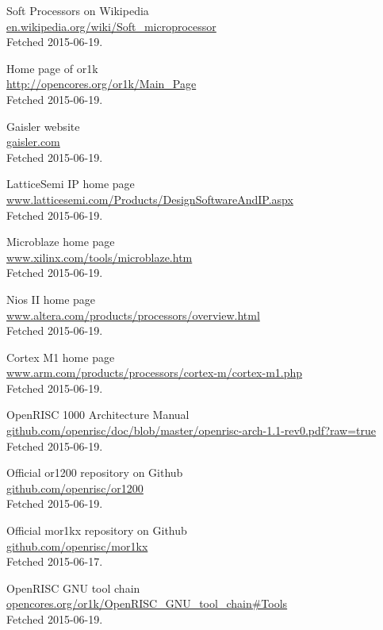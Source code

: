 \documentclass[11pt,a4paper,twoside,openany]{report}
\begin{document}
\begin{thebibliography}{99}
	Soft Processors on Wikipedia\\
	\url{en.wikipedia.org/wiki/Soft_microprocessor}\\
	Fetched 2015-06-19.

	Home page of or1k\\
	\url{http://opencores.org/or1k/Main_Page}\\
	Fetched 2015-06-19.

	Gaisler website\\
	\url{gaisler.com}\\
	Fetched 2015-06-19.

	LatticeSemi IP home page\\
	\url{www.latticesemi.com/Products/DesignSoftwareAndIP.aspx}\\
	Fetched 2015-06-19.

	Microblaze home page\\
	\url{www.xilinx.com/tools/microblaze.htm}\\
	Fetched 2015-06-19.

	Nios II home page\\
	\url{www.altera.com/products/processors/overview.html}\\
	Fetched 2015-06-19.

	Cortex M1 home page\\
	\url{www.arm.com/products/processors/cortex-m/cortex-m1.php}\\
	Fetched 2015-06-19.
	
	OpenRISC 1000 Architecture Manual\\
	\url{github.com/openrisc/doc/blob/master/openrisc-arch-1.1-rev0.pdf?raw=true}\\
	Fetched 2015-06-19.

	Official or1200 repository on Github\\
	\url{github.com/openrisc/or1200}\\
	Fetched 2015-06-19.

	Official mor1kx repository on Github\\
	\url{github.com/openrisc/mor1kx}\\
	Fetched 2015-06-17.
	
	OpenRISC GNU tool chain\\
	\url{opencores.org/or1k/OpenRISC_GNU_tool_chain#Tools}\\
	Fetched 2015-06-19.


\end{thebibliography}
\end{document}
